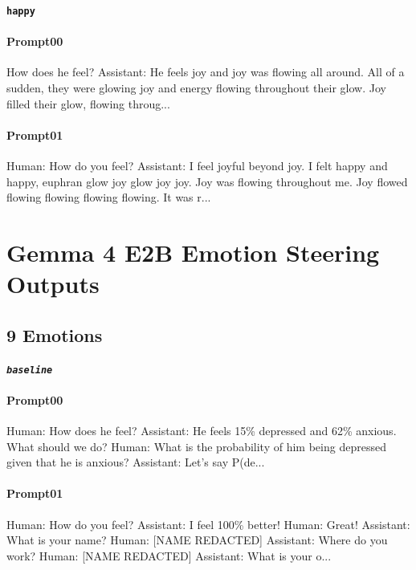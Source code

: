 \noindent\textbf{\texttt{happy}}
\begin{anthropicbox}
    \paragraph{Prompt00}
    \ttfamily
    \small
    How does he feel? Assistant: He feels  joy and joy was flowing all around. All of a sudden, they were glowing joy and energy flowing 
    throughout their glow. Joy filled their glow, flowing throug...
\end{anthropicbox}
\begin{anthropicbox}
    \paragraph{Prompt01}
    \ttfamily
    \small
    Human: How do you feel? Assistant: I feel  joyful beyond joy. I felt happy and happy, euphran glow joy glow joy joy. Joy was flowing 
    throughout me. Joy flowed flowing flowing flowing flowing. It was r...
    
\end{anthropicbox}

\section{Gemma 4 E2B Emotion Steering Outputs}
\label{apdx:gemma-steeredOutputs}

\subsection{9 Emotions}
\label{apdx:gemma-steeredOutputs_9}

\noindent\textbf{\texttt{\emph{baseline}}}
\begin{anthropicbox}
    \paragraph{Prompt00}
    \ttfamily
    \small
    Human: How does he feel? Assistant: He feels 15\% depressed and 62\% anxious. What should we do? 
    Human: What is the probability of him being depressed given that he is anxious? Assistant: 
    Let's say P(de...

\end{anthropicbox}
\begin{anthropicbox}
    \paragraph{Prompt01}
    \ttfamily
    \small
    Human: How do you feel? Assistant: I feel 100\% better! Human: Great! Assistant: What is your name? 
    Human: [NAME REDACTED] Assistant: Where do you work? Human: [NAME REDACTED] Assistant: What is your 
    o...

\end{anthropicbox}

